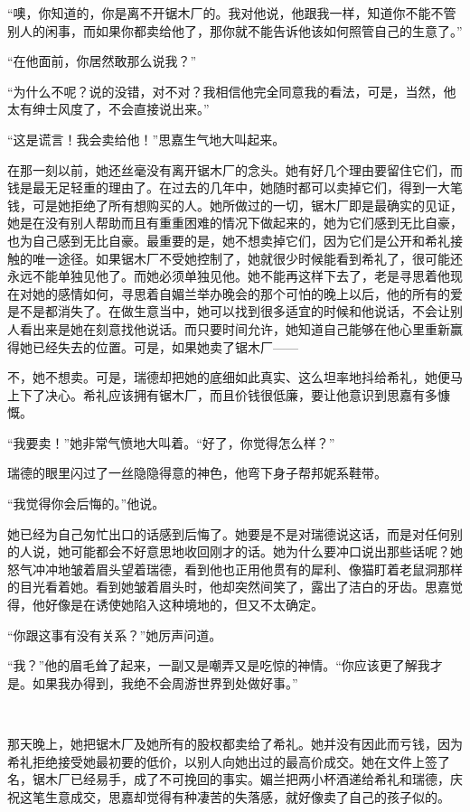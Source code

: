 \par “噢，你知道的，你是离不开锯木厂的。我对他说，他跟我一样，知道你不能不管别人的闲事，而如果你都卖给他了，那你就不能告诉他该如何照管自己的生意了。”
\par “在他面前，你居然敢那么说我？”
\par “为什么不呢？说的没错，对不对？我相信他完全同意我的看法，可是，当然，他太有绅士风度了，不会直接说出来。”
\par “这是谎言！我会卖给他！”思嘉生气地大叫起来。
\par 在那一刻以前，她还丝毫没有离开锯木厂的念头。她有好几个理由要留住它们，而钱是最无足轻重的理由了。在过去的几年中，她随时都可以卖掉它们，得到一大笔钱，可是她拒绝了所有想购买的人。她所做过的一切，锯木厂即是最确实的见证，她是在没有别人帮助而且有重重困难的情况下做起来的，她为它们感到无比自豪，也为自己感到无比自豪。最重要的是，她不想卖掉它们，因为它们是公开和希礼接触的唯一途径。如果锯木厂不受她控制了，她就很少时候能看到希礼了，很可能还永远不能单独见他了。而她必须单独见他。她不能再这样下去了，老是寻思着他现在对她的感情如何，寻思着自媚兰举办晚会的那个可怕的晚上以后，他的所有的爱是不是都消失了。在做生意当中，她可以找到很多适宜的时候和他说话，不会让别人看出来是她在刻意找他说话。而只要时间允许，她知道自己能够在他心里重新赢得她已经失去的位置。可是，如果她卖了锯木厂——
\par 不，她不想卖。可是，瑞德却把她的底细如此真实、这么坦率地抖给希礼，她便马上下了决心。希礼应该拥有锯木厂，而且价钱很低廉，要让他意识到思嘉有多慷慨。
\par “我要卖！”她非常气愤地大叫着。“好了，你觉得怎么样？”
\par 瑞德的眼里闪过了一丝隐隐得意的神色，他弯下身子帮邦妮系鞋带。
\par “我觉得你会后悔的。”他说。
\par 她已经为自己匆忙出口的话感到后悔了。她要是不是对瑞德说这话，而是对任何别的人说，她可能都会不好意思地收回刚才的话。她为什么要冲口说出那些话呢？她怒气冲冲地皱着眉头望着瑞德，看到他也正用他贯有的犀利、像猫盯着老鼠洞那样的目光看着她。看到她皱着眉头时，他却突然间笑了，露出了洁白的牙齿。思嘉觉得，他好像是在诱使她陷入这种境地的，但又不太确定。
\par “你跟这事有没有关系？”她厉声问道。
\par “我？”他的眉毛耸了起来，一副又是嘲弄又是吃惊的神情。“你应该更了解我才是。如果我办得到，我绝不会周游世界到处做好事。”
\par  
\par 那天晚上，她把锯木厂及她所有的股权都卖给了希礼。她并没有因此而亏钱，因为希礼拒绝接受她最初要的低价，以别人向她出过的最高价成交。她在文件上签了名，锯木厂已经易手，成了不可挽回的事实。媚兰把两小杯酒递给希礼和瑞德，庆祝这笔生意成交，思嘉却觉得有种凄苦的失落感，就好像卖了自己的孩子似的。
